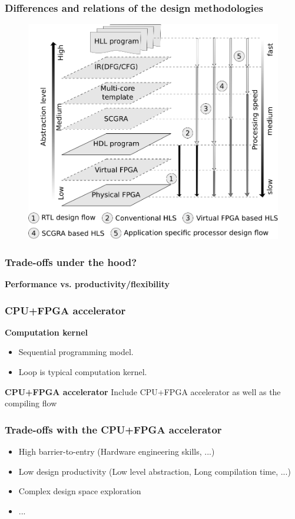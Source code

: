 \documentclass{beamer}
\begin{document}
\begin{frame}[t]
\frametitle{Differences and relations of the design methodologies}

\begin{figure}
  \includegraphics[width=.8\linewidth]{virtual-overlay}
\end{figure}

\end{frame}

\begin{frame}[t]

\frametitle{Trade-offs under the hood?}
\textbf{Performance vs. productivity/flexibility}

\end{frame}

\begin{frame}[t]
\frametitle{CPU+FPGA accelerator}
\textbf{Computation kernel}
\begin{itemize}
\item Sequential programming model.
\item Loop is typical computation kernel.
\end{itemize}

\textbf{CPU+FPGA accelerator}
Include CPU+FPGA accelerator as well as the compiling flow

\end{frame}

\begin{frame}[t]
\frametitle{Trade-offs with the CPU+FPGA accelerator}
\begin{itemize}
\item High barrier-to-entry (Hardware engineering skills, ...)
\item Low design productivity (Low level abstraction, Long compilation time, ...)
\item Complex design space exploration
\item ...
\end{itemize}
\end{frame}
\end{document}
